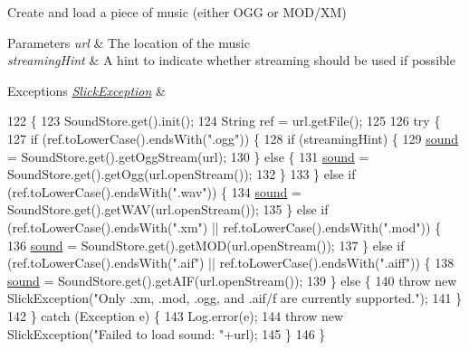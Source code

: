 Create and load a piece of music (either O\+GG or M\+O\+D/\+XM)


\begin{DoxyParams}{Parameters}
{\em url} & The location of the music \\
\hline
{\em streaming\+Hint} & A hint to indicate whether streaming should be used if possible \\
\hline
\end{DoxyParams}

\begin{DoxyExceptions}{Exceptions}
{\em \mbox{\hyperlink{classorg_1_1newdawn_1_1slick_1_1_slick_exception}{Slick\+Exception}}} & \\
\hline
\end{DoxyExceptions}

\begin{DoxyCode}
122                                                                        \{
123         SoundStore.get().init();
124         String ref = url.getFile();
125         
126         \textcolor{keywordflow}{try} \{
127             \textcolor{keywordflow}{if} (ref.toLowerCase().endsWith(\textcolor{stringliteral}{".ogg"})) \{
128                 \textcolor{keywordflow}{if} (streamingHint) \{
129                     \mbox{\hyperlink{classorg_1_1newdawn_1_1slick_1_1_music_a17daed326f24bf361ff8677c33f06b2f}{sound}} = SoundStore.get().getOggStream(url);
130                 \} \textcolor{keywordflow}{else} \{
131                     \mbox{\hyperlink{classorg_1_1newdawn_1_1slick_1_1_music_a17daed326f24bf361ff8677c33f06b2f}{sound}} = SoundStore.get().getOgg(url.openStream());
132                 \}
133             \} \textcolor{keywordflow}{else} \textcolor{keywordflow}{if} (ref.toLowerCase().endsWith(\textcolor{stringliteral}{".wav"})) \{
134                 \mbox{\hyperlink{classorg_1_1newdawn_1_1slick_1_1_music_a17daed326f24bf361ff8677c33f06b2f}{sound}} = SoundStore.get().getWAV(url.openStream());
135             \} \textcolor{keywordflow}{else} \textcolor{keywordflow}{if} (ref.toLowerCase().endsWith(\textcolor{stringliteral}{".xm"}) || ref.toLowerCase().endsWith(\textcolor{stringliteral}{".mod"})) \{
136                 \mbox{\hyperlink{classorg_1_1newdawn_1_1slick_1_1_music_a17daed326f24bf361ff8677c33f06b2f}{sound}} = SoundStore.get().getMOD(url.openStream());
137             \} \textcolor{keywordflow}{else} \textcolor{keywordflow}{if} (ref.toLowerCase().endsWith(\textcolor{stringliteral}{".aif"}) || ref.toLowerCase().endsWith(\textcolor{stringliteral}{".aiff"})) \{
138                 \mbox{\hyperlink{classorg_1_1newdawn_1_1slick_1_1_music_a17daed326f24bf361ff8677c33f06b2f}{sound}} = SoundStore.get().getAIF(url.openStream());
139             \} \textcolor{keywordflow}{else} \{
140                 \textcolor{keywordflow}{throw} \textcolor{keyword}{new} SlickException(\textcolor{stringliteral}{"Only .xm, .mod, .ogg, and .aif/f are currently supported."});
141             \}
142         \} \textcolor{keywordflow}{catch} (Exception e) \{
143             Log.error(e);
144             \textcolor{keywordflow}{throw} \textcolor{keyword}{new} SlickException(\textcolor{stringliteral}{"Failed to load sound: "}+url);
145         \}
146     \}
\end{DoxyCode}
